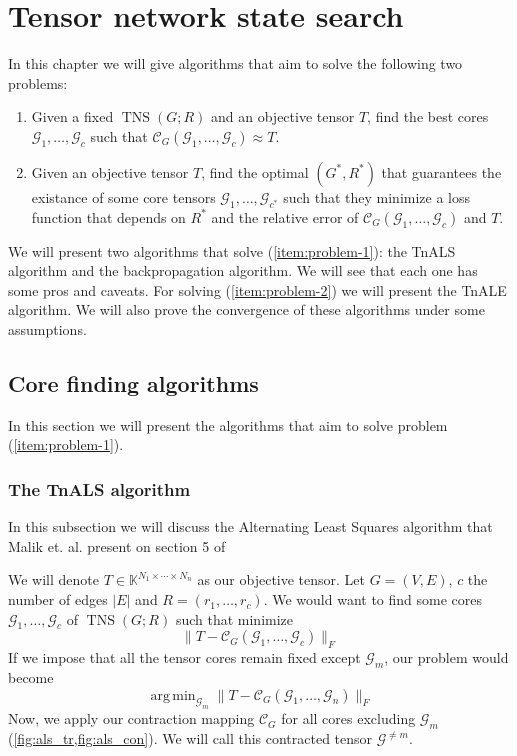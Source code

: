 \documentclass[11pt,a4paper,openright,oneside]{book}
\numberwithin{equation}{section}
\newcommand{\figref}[1]{\cref{#1}}
\DeclareMathOperator{\TNS}{TNS}
\DeclareMathOperator*{\argmin}{arg\,min}
\begin{document}
{ %






\chapter{Tensor network state search}

In this chapter we will give algorithms that aim to solve the following two problems:
\begin{enumerate}
    \item \label{item:problem-1} Given a fixed $\TNS(G; R)$ and an objective tensor $T$, find the best cores $\mathcal{G}_1, \dots, \mathcal{G}_c$ such that
        $\mathcal{C}_G (\mathcal{G}_1, \dots, \mathcal{G}_c) \approx T$.
    \item \label{item:problem-2} Given an objective tensor $T$, find the optimal $(G^*, R^*)$ that guarantees the existance of some core tensors
        $\mathcal{G}_1, \dots, \mathcal{G}_{c^*}$ such that they minimize a loss function that depends on $R^*$ and the relative
        error of $\mathcal{C}_G (\mathcal{G}_1, \dots, \mathcal{G}_c)$ and $T$.
\end{enumerate}

We will present two algorithms that solve (\ref{item:problem-1}): the TnALS algorithm and the backpropagation algorithm. We will
see that each one has some pros and caveats. For solving (\ref{item:problem-2}) we will present the TnALE algorithm. We will also prove 
the convergence of these algorithms under some assumptions.

\section{Core finding algorithms}

In this section we will present the algorithms that aim to solve problem (\ref{item:problem-1}).

\subsection{The TnALS algorithm}

In this subsection we will discuss the Alternating Least Squares algorithm that Malik et. al. present on section 5 of
\cite{malikSamplingBasedDecompositionAlgorithms2022}

We will denote $T \in \mathbb{K}^{N_1 \times \cdots \times N_n}$ as our objective tensor. Let $G = (V, E)$, $c$ the number of edges $|E|$ and $R = (r_1, \dots, r_c)$.
We would want to find some cores
$\mathcal{G}_1, \dots, \mathcal{G}_c$ of $\TNS(G; R)$ such that minimize
$$\|T - \mathcal{C}_G (\mathcal{G}_1, \dots, \mathcal{G}_c)\|_F$$
If we impose that all the tensor cores remain fixed except $\mathcal{G}_m$, our problem would become
$$\argmin_{\mathcal{G}_m} \|T - \mathcal{C}_G(\mathcal{G}_1, \dots, \mathcal{G}_n)\|_F$$
Now, we apply our contraction mapping $\mathcal{C}_G$ for all cores excluding $\mathcal{G}_m$ (\figref{fig:als_tr,fig:als_con}).
We will call this contracted tensor $\mathcal{G}^{\neq m}$. 

}
\end{document}
